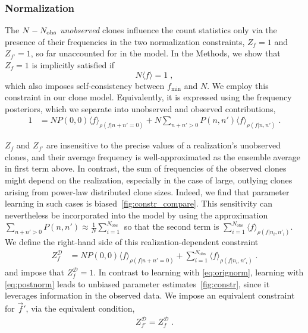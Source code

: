 \documentclass[letterpaper,english,prl,reprint,longbibliography]{revtex4-1} %
\begin{document}
\subsubsection*{Normalization}
The $N-N_{\textrm{\textrm{obs}}}$ \emph{unobserved} clones influence the count statistics only via the presence of their frequencies in the two normalization constraints, $Z_f=1$ and $Z_{f'}=1$, so far unaccounted for in the model.
In the Methods, we show that $Z_f=1$ is implicitly satisfied if 
\begin{equation}
	N\langle f\rangle=1\;,\label{eq:orignorm}
\end{equation}
which also imposes self-consistency between $f_\textrm{min}$ and $N$. We employ this constraint in our clone model. Equivalently, it is expressed using the frequency posteriors, which we separate into unobserved and observed contributions,
\begin{align*}
	1&= NP(0,0) \langle f\rangle_{\rho(f|n+n'=0)}+	N\sum_{n+n'>0}P(n,n')\langle f\rangle_{\rho(f|n,n')}\;.
\end{align*}

$Z_f$ and $Z_{f'}$ are insensitive to the precise values of a realization's unobserved clones, and their average frequency is well-approximated as the ensemble average in first term above. In contrast, the sum of frequencies of the observed clones might depend on the realization, especially in the case of large, outlying clones arising from power-law distributed clone sizes. Indeed, we find that parameter learning in such cases is biased~\ref{fig:constr_compare}. This sensitivity can nevertheless be incorporated into the model by using the approximation $\sum_{n+n'>0}P(n,n')\approx \frac{1}{N}\sum_{i=1}^{N_\textrm{obs}}$ so that the second term is $\sum_{i=1}^{N_{\textrm{obs}}}\langle f\rangle_{\rho(f|n_i,n'_i)}$. We define the right-hand side of this realization-dependent constraint 
\begin{align}
	Z^\mathcal{D}_f&= N	P(0,0)\langle f\rangle_{\rho(f|n+n'=0)} + \sum_{i=1}^{N_{\textrm{obs}}}\langle f\rangle_{\rho(f|n_i,n'_i)}\;.\label{eq:postnorm}
\end{align}
and impose that $Z^\mathcal{D}_f=1$. In contrast to learning with \ref{eq:orignorm}, learning with \ref{eq:postnorm} leads to unbiased parameter estimates~\ref{fig:constr}, since it leverages information in the observed data. We impose an equivalent constraint for $\vec{f}'$, via the equivalent condition, 
\begin{align}
	Z^\mathcal{D}_{f'}=Z^\mathcal{D}_f\;.\label{eq:fprimeconst}
\end{align}
\end{document}
